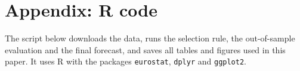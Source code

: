 \documentclass[11pt]{article}
\begin{document}
\newpage
\appendix
\section*{Appendix: R code}
The script below downloads the data, runs the selection rule, the out-of-sample evaluation and the final forecast, and saves all tables and figures used in this paper. It uses R with the packages \texttt{eurostat}, \texttt{dplyr} and \texttt{ggplot2}.

\end{document}
